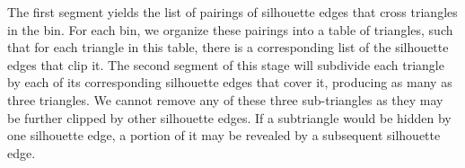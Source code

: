\documentclass[review]{acmsiggraph}
\begin{document}

The first segment yields the list of pairings of silhouette edges that cross
triangles in the bin. For each bin, we organize these pairings into a table of
triangles, such that for each triangle in this table, there is a corresponding
list of the silhouette edges that clip it. The second segment of this stage
will subdivide each triangle by each of its corresponding silhouette edges
that cover it, producing as many as three triangles. We cannot remove any of
these three sub-triangles as they may be further clipped by other silhouette
edges.  If a subtriangle would be hidden by one silhouette edge, a
portion of it may be revealed by a subsequent silhouette edge.


\end{document}
